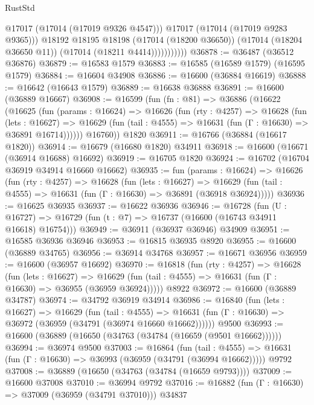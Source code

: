 \begin{lexlean}{RustStd}
\begin{coremodule}
                          @17017
                          (@17014 (@17019 @9326 @4547)))
                        @17017
                        (@17014 (@17019 @9283 @9365)))
                      @18192
                      @18195
                      @18198
                      (@17014 (@18200 @36650))
                      (@17014 (@18204 @36650 @11))
                      (@17014 (@18211 @4414)))))))))))
@36878 := @36487 (@36512 @36876)
@36879 := @16583 @1579
@36883 := @16585 (@16589 @1579) (@16595 @1579)
@36884 := @16604 @34908
@36886 := @16600 (@36884 @16619)
@36888 := @16642 (@16643 @1579)
@36889 := @16638 @36888
@36891 := @16600 (@36889 @16667)
@36908 := @16599
    (fun (fn : @81) =>
    @36886
      (@16622
        (@16625
          (fun (params : @16624) =>
          @16626
            (fun (rty : @4257) =>
            @16628
              (fun (lets : @16627) =>
              @16629 (fun (tail : @4555) => @16631 (fun (Γ : @16630) => @36891 @16714))))))
        @16760))
    @1820
@36911 := @16766 (@36884 (@16617 @1820))
@36914 := @16679 (@16680 @1820) @34911
@36918 := @16600 (@16671 (@36914 @16688) @16692)
@36919 := @16705 @1820
@36924 := @16702 (@16704 @36919 @34914 @16660 @16662)
@36935 := fun (params : @16624) =>
  @16626
    (fun (rty : @4257) =>
    @16628
      (fun (lets : @16627) =>
      @16629 (fun (tail : @4555) => @16631 (fun (Γ : @16630) => @36891 (@36918 @36924)))))
@36936 := @16625 @36935
@36937 := @16622 @36936
@36946 := @16728
    (fun (U : @16727) => @16729 (fun (t : @7) => @16737 (@16600 (@16743 @34911 @16618) @16754)))
@36949 := @36911 (@36937 @36946) @34909
@36951 := @16585 @36936 @36946
@36953 := @16815 @36935 @8920
@36955 := @16600 (@36889 @34765)
@36956 := @36914 @34768
@36957 := @16671 @36956
@36959 := @16600 (@36957 @16692)
@36970 := @16818
    (fun (rty : @4257) =>
    @16628
      (fun (lets : @16627) =>
      @16629 (fun (tail : @4555) => @16631 (fun (Γ : @16630) => @36955 (@36959 @36924)))))
    @8922
@36972 := @16600 (@36889 @34787)
@36974 := @34792 @36919 @34914
@36986 := @16840
    (fun (lets : @16627) =>
    @16629
      (fun (tail : @4555) =>
      @16631 (fun (Γ : @16630) => @36972 (@36959 (@34791 (@36974 @16660 @16662))))))
    @9500
@36993 := @16600 (@36889 (@16650 (@34763 (@34784 (@16659 (@9501 @16662))))))
@36994 := @36974 @9500
@37003 := @16864
    (fun (tail : @4555) => @16631 (fun (Γ : @16630) => @36993 (@36959 (@34791 (@36994 @16662)))))
    @9792
@37008 := @36889 (@16650 (@34763 (@34784 (@16659 @9793))))
@37009 := @16600 @37008
@37010 := @36994 @9792
@37016 := @16882 (fun (Γ : @16630) => @37009 (@36959 (@34791 @37010))) @34837

\end{coremodule}
\end{lexlean}

